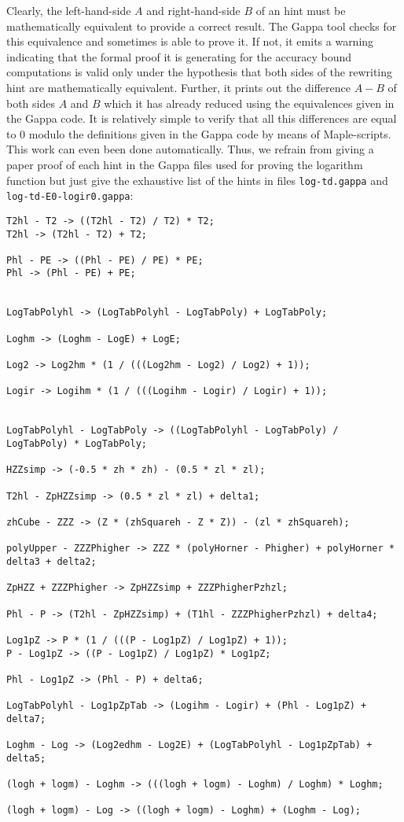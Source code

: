 Clearly, the left-hand-side $A$ and right-hand-side $B$ of an hint must be mathematically equivalent to provide a 
correct result. The Gappa tool checks for this equivalence and sometimes is able to prove it. If not, it emits a
warning indicating that the formal proof it is generating for the accuracy bound computations is valid only under
the hypothesis that both sides of the rewriting hint are mathematically equivalent. Further, it prints out the 
difference $A - B$ of both sides $A$ and $B$ which it has already reduced using the equivalences given in the 
Gappa code. It is relatively simple to verify that all this differences are equal to $0$ modulo the definitions 
given in the Gappa code by means of Maple-scripts. This work can even been done automatically. Thus, we refrain 
from giving a paper proof of each hint in the Gappa files used for proving the logarithm function but just 
give the exhaustive list of the hints in files {\tt log-td.gappa} and {\tt log-td-E0-logir0.gappa}:
\begin{lstlisting}[caption={Gappa term rewriting hints in file {\tt log-td.gappa}},firstnumber=115]
T2hl - T2 -> ((T2hl - T2) / T2) * T2;
T2hl -> (T2hl - T2) + T2;

Phl - PE -> ((Phl - PE) / PE) * PE;
Phl -> (Phl - PE) + PE;


LogTabPolyhl -> (LogTabPolyhl - LogTabPoly) + LogTabPoly;

Loghm -> (Loghm - LogE) + LogE;

Log2 -> Log2hm * (1 / (((Log2hm - Log2) / Log2) + 1));

Logir -> Logihm * (1 / (((Logihm - Logir) / Logir) + 1));


LogTabPolyhl - LogTabPoly -> ((LogTabPolyhl - LogTabPoly) / LogTabPoly) * LogTabPoly;

HZZsimp -> (-0.5 * zh * zh) - (0.5 * zl * zl);

T2hl - ZpHZZsimp -> (0.5 * zl * zl) + delta1;

zhCube - ZZZ -> (Z * (zhSquareh - Z * Z)) - (zl * zhSquareh);

polyUpper - ZZZPhigher -> ZZZ * (polyHorner - Phigher) + polyHorner * delta3 + delta2;

ZpHZZ + ZZZPhigher -> ZpHZZsimp + ZZZPhigherPzhzl;

Phl - P -> (T2hl - ZpHZZsimp) + (T1hl - ZZZPhigherPzhzl) + delta4;

Log1pZ -> P * (1 / (((P - Log1pZ) / Log1pZ) + 1));
P - Log1pZ -> ((P - Log1pZ) / Log1pZ) * Log1pZ;

Phl - Log1pZ -> (Phl - P) + delta6;

LogTabPolyhl - Log1pZpTab -> (Logihm - Logir) + (Phl - Log1pZ) + delta7;

Loghm - Log -> (Log2edhm - Log2E) + (LogTabPolyhl - Log1pZpTab) + delta5;

(logh + logm) - Loghm -> (((logh + logm) - Loghm) / Loghm) * Loghm;

(logh + logm) - Log -> ((logh + logm) - Loghm) + (Loghm - Log);
\end{lstlisting}
